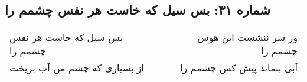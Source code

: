 \begin{center}
\section*{شماره ۳۱: بس سیل که خاست هر نفس چشمم را}
\label{sec:031}
\begin{longtable}{l p{0.5cm} r}
بس سیل که خاست هر نفس چشمم را
&&
وز سر ننشست این هوس چشمم را
\\
از بسیاری که چشم من آب بریخت
&&
آبی بنماند پیش کس چشمم را
\\
\end{longtable}
\end{center}
